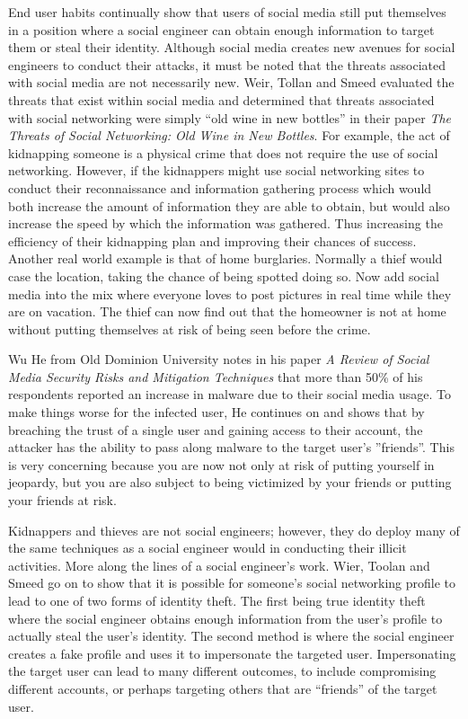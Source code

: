 \documentclass[conference]{IEEEtran}
\begin{document}
End user habits continually show that users of social media still put themselves in a position where a social engineer can obtain enough information to target them or steal their identity.  Although social media creates new avenues for social engineers to conduct their attacks, it must be noted that the threats associated with social media are not necessarily new. Weir, Tollan and Smeed evaluated the threats that exist within social media and determined that threats associated with social networking were simply “old wine in new bottles” in their paper \textit{The Threats of Social Networking: Old Wine in New Bottles}\cite{Weir:2011:TSN:2076032.2076216}. For example, the act of kidnapping someone is a physical crime that does not require the use of social networking. However, if the kidnappers might use social networking sites to conduct their reconnaissance and information gathering process which would both increase the amount of information they are able to obtain, but would also increase the speed by which the information was gathered.  Thus increasing the efficiency of their kidnapping plan and improving their chances of success.  Another real world example is that of home burglaries. Normally a thief would case the location, taking the chance of being spotted doing so. Now add social media into the mix where everyone loves to post pictures in real time while they are on vacation.  The thief can now find out that the homeowner is not at home without putting themselves at risk of being seen before the crime.  

Wu He from Old Dominion University notes in his paper \textit{A Review of Social Media Security Risks and Mitigation Techniques} that more than 50\% of his respondents reported an increase in malware due to their social media usage\cite{he_2012}.  To make things worse for the infected user, He continues on and shows that by breaching the trust of a single user and gaining access to their account, the attacker has the ability to pass along malware to the target user's ''friends''\cite{he_2012}.  This is very concerning because you are now not only at risk of putting yourself in jeopardy, but you are also subject to being victimized by your friends or putting your friends at risk. 

Kidnappers and thieves are not social engineers; however, they do deploy many of the same techniques as a social engineer would in conducting their illicit activities. More along the lines of a social engineer's work. Wier, Toolan and Smeed go on to show that it is possible for someone's social networking profile to lead to one of two forms of identity theft\cite{Weir:2011:TSN:2076032.2076216}. The first being true identity theft where the social engineer obtains enough information from the user's profile to actually steal the user's identity.  The second method is where the social engineer creates a fake profile and uses it to impersonate the targeted user\cite{Weir:2011:TSN:2076032.2076216}. Impersonating the target user can lead to many different outcomes, to include compromising different accounts, or perhaps targeting others that are “friends” of the target user.  
\end{document}
